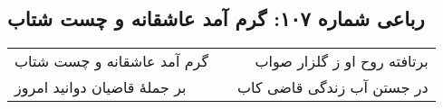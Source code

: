 \begin{center}
\section*{رباعی شماره ۱۰۷: گرم آمد عاشقانه و چست شتاب}
\label{sec:0107}
\begin{longtable}{l p{0.5cm} r}
گرم آمد عاشقانه و چست شتاب
&&
برتافته روح او ز گلزار صواب
\\
بر جملهٔ قاضیان دوانید امروز
&&
در جستن آب زندگی قاضی کاب
\\
\end{longtable}
\end{center}
